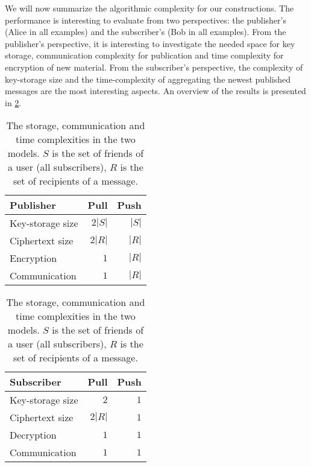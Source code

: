We will now summarize the algorithmic complexity for our constructions.
The performance is interesting to evaluate from two perspectives: the 
publisher's (Alice in all examples) and the subscriber's (Bob in all examples).
From the publisher's perspective, it is interesting to investigate the needed 
space for key storage, communication complexity for publication and time 
complexity for encryption of new material.
From the subscriber's perspective, the complexity of key-storage size and the 
time-complexity of aggregating the newest published messages are the most 
interesting aspects.
An overview of the results is presented in \cref{Complexities}.

\begin{table}
  \centering
  \caption{%
    The storage, communication and time complexities in the two models.
    \(S\) is the set of friends of a user (all subscribers), \(R\) is the set 
    of recipients of a message.
  }\label{Complexities}
  \begin{tabular}{lrr}
    Publisher
    & Pull
    & Push \\
    
    \toprule

    Key-storage size
    & \(2|S|\) & \(|S|\) \\

    \pause{}%
    Ciphertext size
    & \(2|R|\) & \(|R|\) \\

    Encryption
    & \(1\) & \(|R|\) \\

    \pause{}%
    Communication
    & \(1\) & \(|R|\) \\

    \bottomrule

  \end{tabular}
  \begin{tabular}{lrr}
    Subscriber
    & Pull & Push \\
    
    \toprule

    Key-storage size
    & \(2\) & \(1\) \\

    \pause{}%
    Ciphertext size
    & \(2|R|\) & \(1\) \\

    Decryption
    & \(1\) & \(1\) \\

    \pause{}%
    Communication
    & \(1\) & \(1\) \\

    \bottomrule

  \end{tabular}
\end{table}

